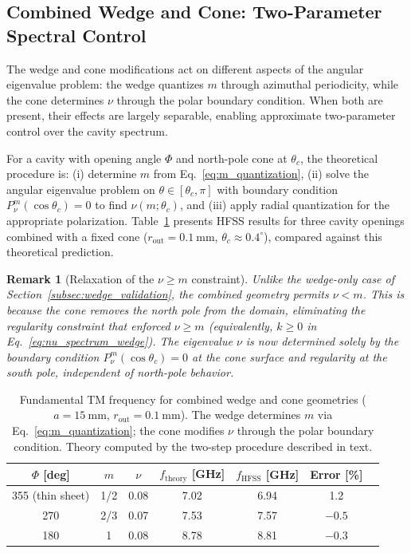 \documentclass[
  aip,
  amsmath,amssymb,
  preprint
]{revtex4-1}
\newtheorem{remark}{Remark}[section]
\begin{document}
\subsection{Combined Wedge and Cone: Two-Parameter Spectral Control}
\label{subsec:combined_validation}

The wedge and cone modifications act on different aspects of the angular eigenvalue problem: the wedge quantizes $m$ through azimuthal periodicity, while the cone determines $\nu$ through the polar boundary condition. When both are present, their effects are largely separable, enabling approximate two-parameter control over the cavity spectrum.

For a cavity with opening angle $\Phi$ and north-pole cone at $\theta_c$, the theoretical procedure is: (i) determine $m$ from Eq.~\eqref{eq:m_quantization}, (ii) solve the angular eigenvalue problem on $\theta \in [\theta_c, \pi]$ with boundary condition $P_\nu^m(\cos\theta_c) = 0$ to find $\nu(m; \theta_c)$, and (iii) apply radial quantization for the appropriate polarization. Table~\ref{tab:combined_spectrum} presents HFSS results for three cavity openings combined with a fixed cone ($r_{\mathrm{out}} = 0.1~\mathrm{mm}$, $\theta_c \approx 0.4^\circ$), compared against this theoretical prediction.

\begin{remark}[Relaxation of the $\nu \geq m$ constraint]
Unlike the wedge-only case of Section~\ref{subsec:wedge_validation}, the combined geometry permits $\nu < m$. This is because the cone removes the north pole from the domain, eliminating the regularity constraint that enforced $\nu \geq m$ (equivalently, $k \geq 0$ in Eq.~\eqref{eq:nu_spectrum_wedge}). The eigenvalue $\nu$ is now determined solely by the boundary condition $P_\nu^m(\cos\theta_c) = 0$ at the cone surface and regularity at the south pole, independent of north-pole behavior.
\end{remark}

\begin{table}[htbp]
\centering
\caption{Fundamental TM frequency for combined wedge and cone geometries ($a = 15~\mathrm{mm}$, $r_{\mathrm{out}} = 0.1~\mathrm{mm}$). The wedge determines $m$ via Eq.~\eqref{eq:m_quantization}; the cone modifies $\nu$ through the polar boundary condition. Theory computed by the two-step procedure described in text.}
\label{tab:combined_spectrum}
\begin{tabular}{ccccccc}
\toprule
$\Phi$ [deg] & $m$ & $\nu$ & $f_{\mathrm{theory}}$ [GHz] & $f_{\mathrm{HFSS}}$ [GHz] & Error [\%] \\
\midrule
355 (thin sheet) & 1/2 & 0.08 & 7.02 & 6.94 & 1.2 \\
270 & 2/3 & 0.07 & 7.53 & 7.57 & $-0.5$ \\
180 & 1 & 0.08 & 8.78 & 8.81 & $-0.3$ \\
\bottomrule
\end{tabular}
\end{table}
\end{document}
